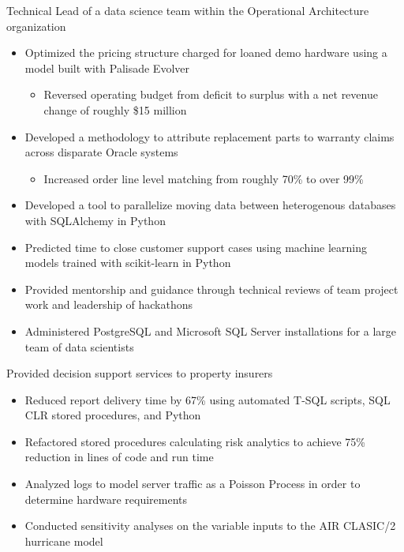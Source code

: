 \documentclass[10pt,a4paper,sans]{moderncv}        %
\begin{document}
{Technical Lead of a data science team within the Operational Architecture organization
\begin{itemize}
	\item Optimized the pricing structure charged for loaned demo hardware using a model built with Palisade Evolver
	\begin{itemize}
		\item Reversed operating budget from deficit to surplus with a net revenue change of roughly \$15 million
	\end{itemize}
	\item Developed a methodology to attribute replacement parts to warranty claims across disparate Oracle systems
	\begin{itemize}
		\item Increased order line level matching from roughly 70\% to over 99\%
	\end{itemize}
	\item Developed a tool to parallelize moving data between heterogenous databases with SQLAlchemy in Python
􏰂	\item Predicted time to close customer support cases using machine learning models trained with scikit-learn in Python
	\item Provided mentorship and guidance through technical reviews of team project work and leadership of hackathons
	\item Administered PostgreSQL and Microsoft SQL Server installations for a large team of data scientists
\end{itemize}}

{Provided decision support services to property insurers
\begin{itemize}
	\item Reduced report delivery time by 67\% using automated T-SQL scripts, SQL CLR stored procedures, and Python
	\item Refactored stored procedures calculating risk analytics to achieve 75\% reduction in lines of code and run time
	\item Analyzed logs to model server traffic as a Poisson Process in order to determine hardware requirements
	\item Conducted sensitivity analyses on the variable inputs to the AIR CLASIC/2 hurricane model
\end{itemize}}
\end{document}
